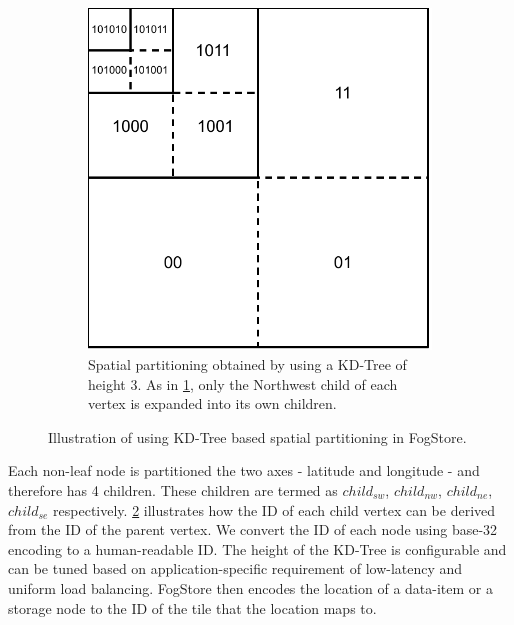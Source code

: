 \begin{figure}[ht]
\begin{subfigure}[b]{0.45\linewidth}
    \label{fig:fogstore_kd_tree}
  \end{subfigure}
  ~~~~
  \begin{subfigure}[b]{0.45\linewidth}
    \includegraphics[width=\linewidth]{figures/fogstore/tile_ids.pdf}
    \caption{Spatial partitioning obtained by using a KD-Tree of height 3. As in \cref{fig:fogstore_kd_tree}, only the Northwest child of each vertex is expanded into its own children.}
    \label{fig:fogstore_tile_ids}
  \end{subfigure}
  \caption{Illustration of using KD-Tree based spatial partitioning in FogStore.}
  \label{fig:fogstore_partitioning}
\end{figure}
Each non-leaf node is partitioned the two axes - latitude and longitude - and therefore has 4 children. These children are termed as $child_{sw}$, $child_{nw}$, $child_{ne}$, $child_{se}$ respectively. \cref{fig:fogstore_tile_ids} illustrates how the ID of each child vertex can be derived from the ID of the parent vertex. We convert the ID of each node using base-32 encoding to a human-readable ID.
The height of the KD-Tree is configurable and can be tuned based on application-specific requirement of low-latency and uniform load balancing.
FogStore then encodes the location of a data-item or a storage node to the ID of the tile that the location maps to.

